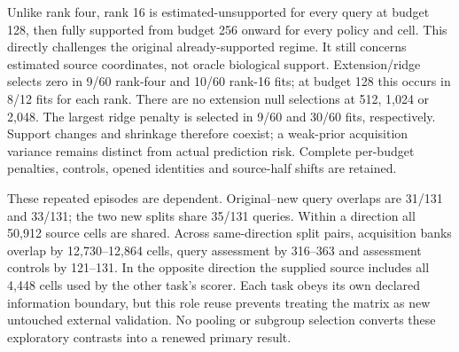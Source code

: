 Unlike rank four, rank 16 is estimated-unsupported for every query at budget 128, then fully supported from budget 256 onward for every policy and cell. This directly challenges the original already-supported regime. It still concerns estimated source coordinates, not oracle biological support. Extension/ridge selects zero in 9/60 rank-four and 10/60 rank-16 fits; at budget 128 this occurs in 8/12 fits for each rank. There are no extension null selections at 512, 1,024 or 2,048. The largest ridge penalty is selected in 9/60 and 30/60 fits, respectively. Support changes and shrinkage therefore coexist; a weak-prior acquisition variance remains distinct from actual prediction risk. Complete per-budget penalties, controls, opened identities and source-half shifts are retained.

These repeated episodes are dependent. Original--new query overlaps are 31/131 and 33/131; the two new splits share 35/131 queries. Within a direction all 50,912 source cells are shared. Across same-direction split pairs, acquisition banks overlap by 12,730--12,864 cells, query assessment by 316--363 and assessment controls by 121--131. In the opposite direction the supplied source includes all 4,448 cells used by the other task's scorer. Each task obeys its own declared information boundary, but this role reuse prevents treating the matrix as new untouched external validation. No pooling or subgroup selection converts these exploratory contrasts into a renewed primary result.

\begin{table}[htbp]
\centering\footnotesize
\caption{The same new robustness runs restricted to the 128--512 subgrid. Units, sign, split labels and conditional ranges match Table~\ref{tab:robust-full}. Three of eight point contrasts favor the extension against worst-query and two of eight against mean-query. All cells remain visible regardless of direction or sign.}
\label{tab:robust-original}

\end{table}
